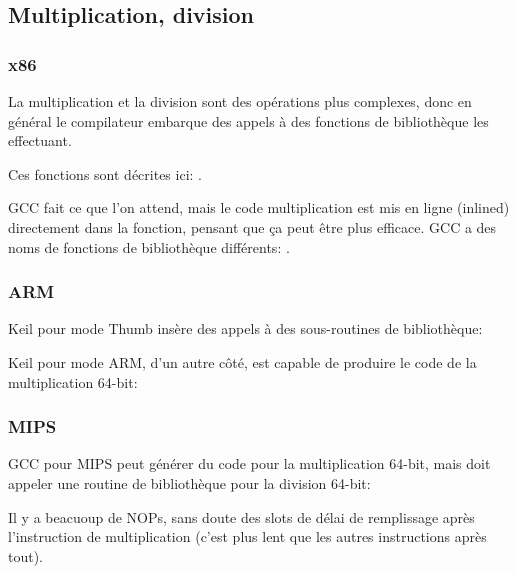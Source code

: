 ﻿\subsection{Multiplication, division}



\subsubsection{x86}



La multiplication et la division sont des opérations plus complexes, donc en général
le compilateur embarque des appels à des fonctions de bibliothèque les effectuant.

Ces fonctions sont décrites ici: .



GCC fait ce que l'on attend, mais le code multiplication est mis en ligne (inlined)
directement dans la fonction, pensant que ça peut être plus efficace.
GCC a des noms de fonctions de bibliothèque différents: .

\subsubsection{ARM}

Keil pour mode Thumb insère des appels à des sous-routines de bibliothèque:



Keil pour mode ARM, d'un autre côté, est capable de produire le code de la multiplication
64-bit:



\subsubsection{MIPS}

GCC \Optimizing pour MIPS peut générer du code pour la multiplication 64-bit, mais
doit appeler une routine de bibliothèque pour la division 64-bit:



Il y a beacuoup de \ac{NOP}s, sans doute des slots de délai de remplissage après
l'instruction de multiplication (c'est plus lent que les autres instructions après
tout).

